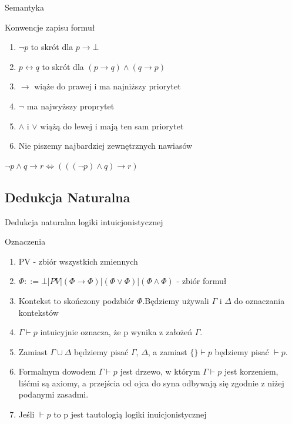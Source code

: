 \documentclass{beamer}
\begin{document}
\begin{frame}{Semantyka}
 \begin{block}{Konwencje zapisu formuł}
 \begin{enumerate}
  \item  \( \neg p \) to skrót dla \( p \rightarrow \bot\)
  \item \( p\leftrightarrow q \) to skrót dla \( (p \rightarrow q ) \wedge ( q \rightarrow p ) \)
  \item  \( \rightarrow \) wiąże do prawej i ma najniższy priorytet
  \item  \( \neg \) ma najwyższy proprytet
  \item \( \wedge \) i \( \vee \) wiążą do lewej i mają ten sam priorytet
  \item Nie piszemy najbardziej zewnętrznych nawiasów
 \end{enumerate}
\end{block}

\begin{example}
\(\neg p \wedge q  \rightarrow r \Leftrightarrow (((\neg p ) \wedge q )  \rightarrow r) \)
\end{example}
\end{frame}

\subsection{Dedukcja Naturalna}
\begin{frame}{Dedukcja naturalna logiki intuicjonistycznej}
 \begin{block}{Oznaczenia}
 \begin{enumerate}
  \item PV - zbiór wszystkich zmiennych
  \item \( \Phi ::= \bot | PV | ( \Phi \rightarrow \Phi ) | ( \Phi \vee \Phi ) | ( \Phi \wedge \Phi ) \) - zbiór formuł
  \item  Kontekst to skończony podzbiór \( \Phi \).Będziemy używali \(\Gamma\) i \(\Delta \) do oznaczania kontekstów
  \item  \( \Gamma \vdash p \) intuicyjnie oznacza, że p wynika z założeń \( \Gamma\).
  \item Zamiast \( \Gamma \cup \Delta \) będziemy pisać \(\Gamma\), \(\Delta\), a zamiast \( \{\} \vdash p \) będziemy pisać \( \vdash p \).
  \item Formalnym dowodem \( \Gamma \vdash p \) jest drzewo,  w którym \( \Gamma \vdash p \) jest korzeniem, liśćmi są axiomy, a przejścia od ojca do syna odbywają się zgodnie z niżej podanymi zasadmi.
  \item Jeśli \( \vdash p \) to p jest tautologią logiki inuicjonistycznej
 \end{enumerate}
 \end{block}
 \end{frame}
 
\end{document}
